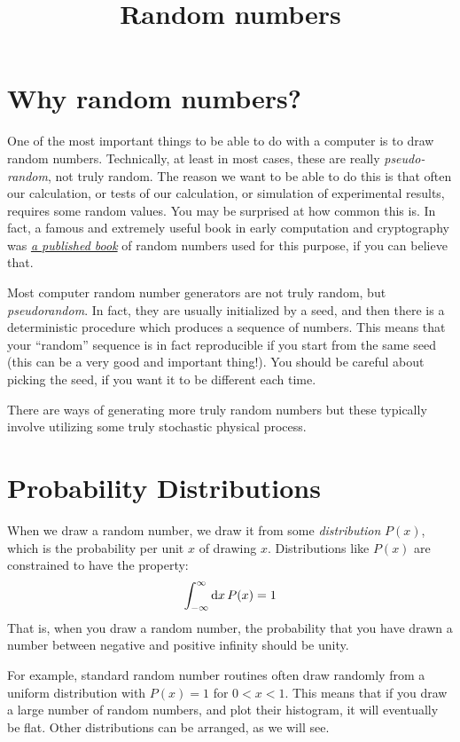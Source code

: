\title{Random numbers}

\section{Why random numbers?}

One of the most important things to be able to do with a computer is
to draw random numbers. Technically, at least in most cases, these are
really {\it pseudo-random}, not truly random. The reason we want to be
able to do this is that often our calculation, or tests of our
calculation, or simulation of experimental results, requires some
random values. You may be surprised at how common this is. In fact, a
famous and extremely useful book in early computation and cryptography
was
\href{https://en.wikipedia.org/wiki/A_Million_Random_Digits_with_100,000_Normal_Deviates}{\it
  a published book} of random numbers used for this purpose, if you
can believe that.

Most computer random number generators are not truly random, but {\it
  pseudorandom}. In fact, they are usually initialized by a seed, and
then there is a deterministic procedure which produces a sequence of
numbers. This means that your ``random'' sequence is in fact
reproducible if you start from the same seed (this can be a very good
and important thing!). You should be careful about picking the seed,
if you want it to be different each time.

There are ways of generating more truly random numbers but these
typically involve utilizing some truly stochastic physical process.

\section{Probability Distributions}

When we draw a random number, we draw it from some {\it distribution}
$P(x)$, which is the probability per unit $x$ of drawing
$x$. Distributions like $P(x)$ are constrained to have the property:
\begin{equation}
\int_{-\infty}^{\infty} {\rm d}x\,P(x) = 1
\end{equation}
That is, when you draw a random number, the probability that you
have drawn a number between negative and positive infinity should be
unity.

For example, standard random number routines often draw randomly from
a uniform distribution with $P(x) = 1$ for $0<x<1$. This means that if
you draw a large number of random numbers, and plot their histogram,
it will eventually be flat. Other distributions can be arranged, as we
will see.

